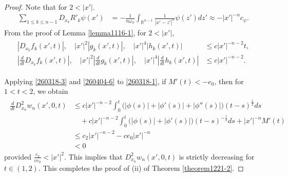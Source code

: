 \documentclass{amsart}
\numberwithin{equation}{section}
\newcommand{\om}{{ \omega  }}
\newcommand{\Rn}{{\mathbb R}^{n-1}}
\begin{document}
\begin{proof}
 

Note that  for  $  2 < | x'| $.
\begin{align}\label{260318-3}
\sum_{1 \leq k \leq n-1} D_{x_k}   R'_k \psi(x')  & = -    \frac1{n\om_n } \int_{\Rn}  \frac{1} {|x' -z'|^n}   \psi(z')   dz'  \approx - |x'|^{-n} c_\psi.
\end{align}
From the proof of Lemma \ref{lemma1116-1},  for $ 2 < |x'| $,
\begin{align}\label{260404-6}
\begin{split}
|     D_{x_k} f_k ( x', t)|, \quad  |x'|^2|     g_k ( x', t)|, \quad |x'|^4 | h_k (x', t) | & \leq   c |x'|^{-n-2} t,\\
|\frac{d}{d t}  D_{x_k}  f _k ( x', t)|,\quad |x'|^2 |\frac{d}{d t}  g _k ( x', t)|,\quad  |x'|^4 |\frac{d}{d t} h_k ( x', t)|  &  \leq c |x'|^{-n-2}.
\end{split}
\end{align}



 
 

Applying    \eqref{260318-3} and \eqref{260404-6} to  \eqref{260318-1}, if $ M'(t) < -e_0$, then  for $ 1 < t < 2$,  we obtain 
 \begin{align}\label{0915-1-1}
 \begin{split}
  \frac{d}{dt} D^2_{x_n} w_n (x', 0, t) & \leq  c|x'|^{-n-2} \int_0^t \Big( |\phi(s)| + |\phi'(s)|  + |\phi''(s)|   \Big) ( t-s)^{\frac12} ds \\
& \quad +  c|x'|^{-n-2} \int_0^t \Big( |\phi(s)| + |\phi'(s)|     \Big) ( t-s)^{-\frac12} ds+ |x'|^{-n } M'(t)\\
  & \leq   c_2 |x'|^{-n-2}   - c e_0 |x'|^{-n}\\
  & < 0
 \end{split}
 \end{align}
provided $ \frac{c_2}{c e_0}   < |x'|^2 $.
This implies  that $ D^2_{x_n}  w_n (x', 0, t) $ is strictly decreasing for $ t \in (1,2)$. This completes the proof of (ii) of 
Theorem \ref{theorem1221-2}.
\end{proof}
 
\end{document}
